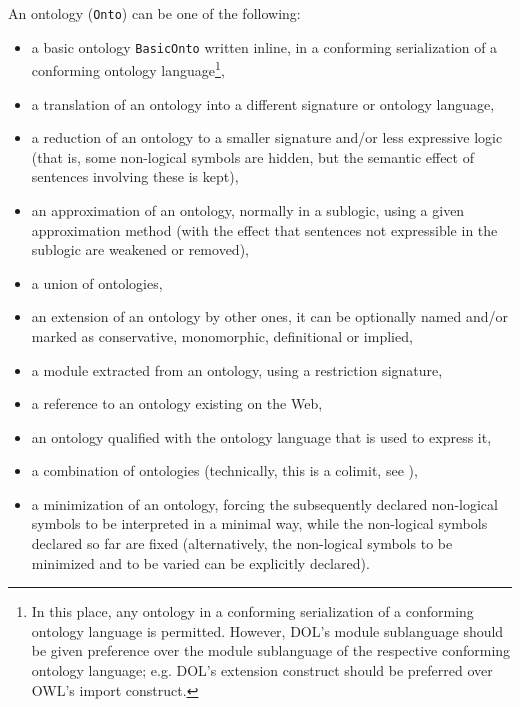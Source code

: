 \documentclass[%
\ifpretendfinal
final%
\else
draft%
\fi,
a4paper,
wd]{isov2}
\makeatletter
\newcommand*{\eg}{e.g.\@\xspace}
\newcommand*{\syntax}[1]{\texttt{#1}}
\makeatother
\begin{document}
An ontology (\syntax{Onto}) can be one of the following:
\begin{itemize}
\item a basic ontology \syntax{BasicOnto} written inline, in a conforming serialization of a conforming ontology language\footnote{In this place, any ontology in a conforming serialization of a conforming ontology language is permitted.  However, DOL's module sublanguage should be given preference over the module sublanguage of the respective conforming ontology language; \eg DOL's extension construct should be preferred over OWL's import construct.},
\item a translation of an ontology into a different signature or ontology
language,
\item a reduction of an ontology to a smaller signature and/or less
expressive logic (that is,
some non-logical symbols are hidden, but the semantic effect of sentences involving these is kept),
\item an approximation of an ontology, normally in a sublogic, using a given approximation method (with the effect that sentences not expressible in the sublogic are weakened or removed),
\item a union of ontologies,
\item an extension of an ontology by other ones, it can be optionally named and/or marked as conservative, monomorphic, definitional or implied,
\item a module extracted from an ontology, using a restriction signature,
\item a reference to an ontology existing on the Web,
\item an ontology qualified with the ontology language that is used to express it,
\item a combination of ontologies (technically, this is a colimit, see ),
\item a minimization of an ontology, forcing the subsequently declared
  non-logical symbols to be interpreted in a minimal way, while the non-logical symbols declared so far are fixed (alternatively, the non-logical symbols to be minimized and to be varied can be explicitly declared).
\end{itemize}
\end{document}
